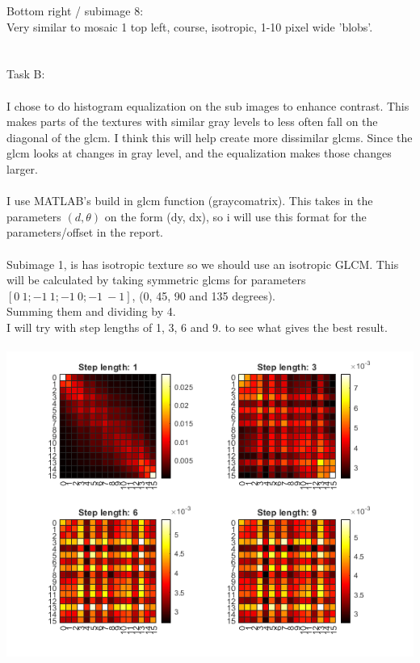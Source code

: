 \documentclass[12pt, letterpaper, twoside]{article}
\begin{document}
Bottom right / subimage 8:\\
Very similar to mosaic 1 top left, course, isotropic, 1-10 pixel wide 'blobs'.\\
\ \\
\ \\
Task B:\\
\ \\
I chose to do histogram equalization on the sub images to enhance contrast. This makes parts of the textures with similar gray levels to less often fall on the diagonal of the glcm. I think this will help create more dissimilar glcms. Since the glcm looks at changes in gray level, and the equalization makes those changes larger.\\
\ \\
I use MATLAB's build in glcm function (graycomatrix). This takes in the parameters $(d, \theta)$ on the form (dy, dx), so i will use this format for the parameters/offset in the report.\\
\newpage
\ \\
Subimage 1, is has isotropic texture so we should use an isotropic GLCM. 
This will be calculated by taking symmetric glcms for parameters\\
$[0\ 1; -1\ 1; -1\ 0; -1\ -1]$, (0, 45, 90 and 135 degrees).\\
Summing them and dividing by 4.\\
I will try with step lengths of 1, 3, 6 and 9. to see what gives the best result.\\
\ \\
\includegraphics[scale=1]{"glcm1.png"}\\
\end{document}
